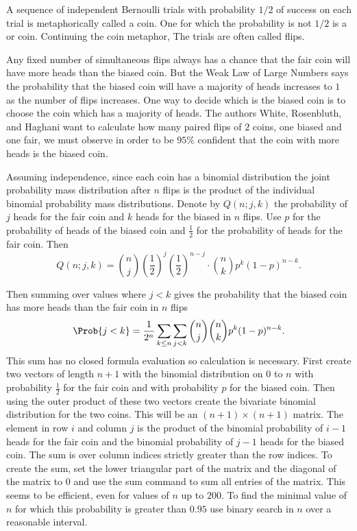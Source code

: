 \documentclass[12pt]{article}
\begin{document}
A sequence of independent Bernoulli trials with probability \( 1/2 \) of
success on each trial is metaphorically called a  coin. One
for which the probability is not \( 1/2 \) is a  or 
coin.  Continuing the coin metaphor, The trials are often called flips.

Any fixed number of simultaneous flips always has a chance that the fair
coin will have more heads than the biased coin.  But the Weak Law of
Large Numbers says the probability that the biased coin will have a
majority of heads increases to \( 1 \) as the number of flips increases.
One way to decide which is the biased coin is to choose the coin which
has a majority of heads.  The authors White, Rosenbluth, and Haghani
want to calculate how many paired flips of \( 2 \) coins, one biased and
one fair, we must observe in order to be \( 95\% \) confident that the
coin with more heads is the biased coin.

Assuming independence, since each coin has a binomial distribution the
joint probability mass distribution after \( n \) flips is the product
of the individual binomial probability mass distributions.%
Denote by \( Q(n; j,k) \) the probability of \( j \) heads for the fair
coin and \( k \) heads for the biased in \( n \) flips.  Use \( p \) for
the probability of heads of the biased coin and \( \frac{1}{2} \) for
the probability of heads for the fair coin.  Then
\[
    Q( n; j, k) = \binom{n}{j} \left( \frac{1}{2} \right)^j \left( \frac
    {1}{2} \right)^{n-j} \cdot \binom{n}{k} p^k (1-p)^{n-k}.
\]%

Then summing over values where \( j < k \) gives the probability that
the biased coin has more heads than the fair coin in \( n \) flips
\[
    \Prob{j<k} = \frac{1}{2^{n}} \sum\limits_{k \le n} \sum\limits_{j <
    k } \binom{n}{j} \binom{n}{k} p^k (1-p)^{n-k}.
\] This sum has no closed formula evaluation so calculation is
necessary.  First create two vectors of length \( n+1 \) with the
binomial distribution on \( 0 \) to \( n \) with probability \( \frac{1}
{2} \) for the fair coin and with probability \( p \) for the biased
coin.  Then using the outer product of these two vectors create the
bivariate binomial distribution for the two coins.  This will be an \( (n+1)
\times (n+1) \) matrix.  The element in row \( i \) and column \( j \)
is the product of the binomial probability of \( i-1 \) heads for the
fair coin and the binomial probability of \( j-1 \) heads for the biased
coin.  The sum is over column indices strictly greater than the row
indices.  To create the sum, set the lower triangular part of the matrix
and the diagonal of the matrix to \( 0 \) and use the sum command to sum
all entries of the matrix.  This seems to be efficient, even for values
of \( n \) up to \( 200 \).  To find the minimal value of \( n \) for
which this probability is greater than \( 0.95 \) use binary search in \(
n \) over a reasonable interval.
\end{document}
